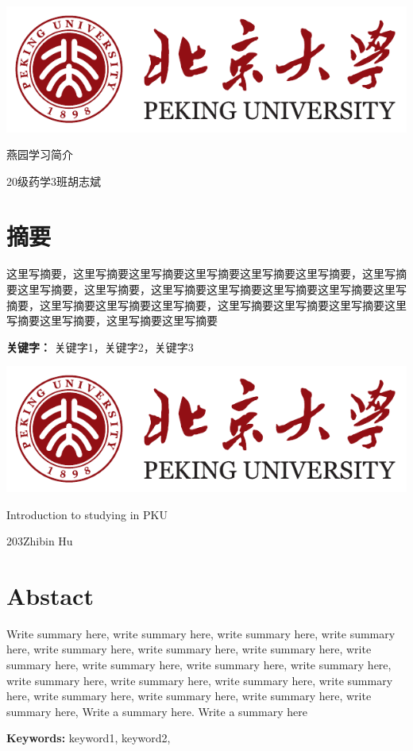 \documentclass[UTF8,12pt,a4paper]{ctexart}
\begin{document}
\setcounter{page}{1}
\thispagestyle{plain}
\vspace*{2.6em}
\begin{center}
	\includegraphics[width=0.6\linewidth]{graphs/logo}
\end{center}
\vspace*{4em}
\centerline{\Huge 燕园学习简介}

\vspace*{2em}

\centerline{\large 20级药学3班\quad 胡志斌}
\vspace*{2em}

\section*{摘要}
这里写摘要，这里写摘要这里写摘要这里写摘要这里写摘要这里写摘要，这里写摘要这里写摘要，这里写摘要，这里写摘要这里写摘要这里写摘要这里写摘要这里写摘要，这里写摘要这里写摘要这里写摘要，这里写摘要这里写摘要这里写摘要这里写摘要这里写摘要，这里写摘要这里写摘要
\par\textbf{关键字：} 关键字1，关键字2，关键字3

\clearpage
\thispagestyle{plain}
\vspace*{2.6em}
\begin{center}
	\includegraphics[width=0.6\linewidth]{graphs/logo}
\end{center}
\vspace*{4em}
\centerline{\Huge Introduction to studying in PKU}

\vspace*{2em}

\centerline{\large 203\quad Zhibin Hu}
\vspace*{2em}

\section*{Abstact}
Write summary here, write summary here, write summary here, write summary here, write summary here, write summary here, write summary here, write summary here, write summary here, write summary here, write summary here, write summary here, write summary here, write summary here, write summary here, write summary here, write summary here, write summary here, write summary here, Write a summary here. Write a summary here
\par\textbf{Keywords:} keyword1, keyword2, 
\clearpage
{}
\thispagestyle{plain}
\end{document}
